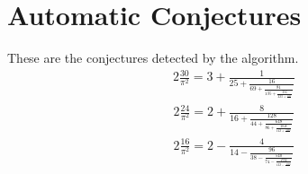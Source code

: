 \documentclass{article}%
\begin{document}
%
\normalsize%
\section{Automatic Conjectures}%
\label{sec:AutomaticConjectures}%
These are the conjectures detected by the algorithm.%
\begin{alignat*}{2}%
\frac{30}{\pi^{2}} = 3 + \frac{1}{25 + \frac{16}{69 + \frac{81}{135 + \frac{256}{223 + \frac{625}{..}}}}}%
\end{alignat*}%
\begin{alignat*}{2}%
\frac{24}{\pi^{2}} = 2 + \frac{8}{16 + \frac{128}{44 + \frac{648}{86 + \frac{2048}{142 + \frac{5000}{..}}}}}%
\end{alignat*}%
\begin{alignat*}{2}%
\frac{16}{\pi^{2}} = 2 - \frac{4}{14 - \frac{96}{38 - \frac{540}{74 - \frac{1792}{122 - \frac{4500}{..}}}}}%
\end{alignat*}

%
\end{document}
